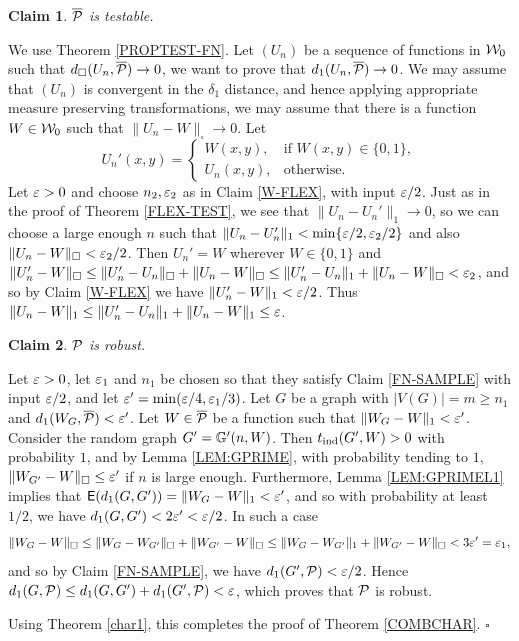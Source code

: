 \documentclass{article}
\newtheorem{claim}{Claim}[theorem]
\newenvironment{proof}{\medskip\noindent{\bf Proof. }}{\hfill$\square$\medskip}
\begin{document}
\begin{proof}
\begin{claim}\label{PPTEST}
$\overline{\mathcal{P}}$ is testable.
\end{claim}

We use Theorem \ref{PROPTEST-FN}. Let $(U_n)$ be a sequence of
functions in $\mathcal{W}_0$ such that $d_\square(U_n,\overline{\mathcal{P}})\to 0$,
we want to prove that $d_1(U_n,\overline{\mathcal{P}})\to 0$. We may assume
that $(U_n)$ is convergent in the $\delta_1$ distance, and hence
applying appropriate measure preserving transformations, we may
assume that there is a function $W\in\mathcal{W}_0$ such that
$\|U_n-W\|_\square\to 0$. Let
\[
U_n'(x,y)=
  \begin{cases}
    W(x,y), & \text{if $W(x,y)\in\{0,1\}$}, \\
    U_n(x,y), & \text{otherwise}.
  \end{cases}
\]
Let $\varepsilon>0$ and choose $n_2,\varepsilon_2$ as in Claim \ref{W-FLEX}, with
input $\varepsilon/2$. Just as in the proof of Theorem \ref{FLEX-TEST}, we
see that $\|U_n-U_n'\|_1\to 0$, so we can choose a large enough $n$
such that $\|U_n-U_n'\|_1<\min\{\varepsilon/2,\varepsilon_2/2\}$ and also
$\|U_n-W\|_\square<\varepsilon_2/2$. Then $U_n'=W$ wherever $W\in\{0,1\}$
and $\|U'_n-W\|_\square\le \|U'_n-U_n\|_\square+\|U_n-W\|_\square\le
\|U'_n-U_n\|_1+\|U_n-W\|_\square<\varepsilon_2$, and so by Claim
\ref{W-FLEX} we have $\|U'_n-W\|_1<\varepsilon/2$. Thus $\|U_n-W\|_1\le
\|U'_n-U_n\|_1+\|U_n-W\|_1\le\varepsilon$.

\begin{claim}\label{PPROBUST}
$\mathcal{P}$ is robust.
\end{claim}

Let $\varepsilon>0$, let $\varepsilon_1$ and $n_1$ be chosen so that they satisfy
Claim \ref{FN-SAMPLE} with input $\varepsilon/2$, and let
$\varepsilon'=\min(\varepsilon/4,\varepsilon_1/3)$. Let $G$ be a graph with $|V(G)|=m\geq
n_1$ and $d_1(W_G,\overline{\mathcal{P}})< \varepsilon'$. Let $W\in\overline{\mathcal{P}}$
be a function such that $\|W_G-W\|_1<\varepsilon'$. Consider the random
graph $G'={\mathbb G}'(n,W)$. Then $t_{\rm ind}(G',W)>0$ with probability $1$, and
by Lemma \ref{LEM:GPRIME}, with probability tending to $1$,
$\|W_{G'}-W\|_\square\le \varepsilon'$ if $n$ is large enough. Furthermore,
Lemma \ref{LEM:GPRIMEL1} implies that
${\sf E}(d_1(G,G'))=\|W_G-W\|_1<\varepsilon'$, and so with probability at least
$1/2$, we have $d_1(G,G')<2\varepsilon'<\varepsilon/2$. In such a case
\[
\|W_G-W\|_\square \le \|W_G-W_{G'}\|_\square + \|W_{G'}-W\|_\square
\le\|W_G-W_{G'}\|_1 + \|W_{G'}-W\|_\square <3\varepsilon'=\varepsilon_1,
\]
and so by Claim \ref{FN-SAMPLE}, we have $d_1(G',\mathcal{P})<\varepsilon/2$. Hence
$d_1(G,\mathcal{P})\le d_1(G,G')+d_1(G',\mathcal{P}) <\varepsilon$, which proves that $\mathcal{P}$
is robust.

Using Theorem \ref{char1}, this completes the proof of Theorem
\ref{COMBCHAR}.
\end{proof}
\end{document}

